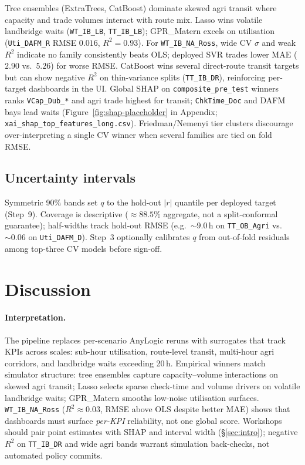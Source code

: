\documentclass[10pt,twocolumn]{article}
\begin{document}
Tree ensembles (ExtraTrees, CatBoost) dominate skewed agri transit where capacity and trade volumes interact with route mix.
Lasso wins volatile landbridge waits (\texttt{WT\_IB\_LB}, \texttt{TT\_IB\_LB}); GPR\_Matern excels on utilisation (\texttt{Uti\_DAFM\_R} RMSE $0.016$, $R^2{=}0.93$).
For \texttt{WT\_IB\_NA\_Ross}, wide CV $\sigma$ and weak $R^2$ indicate no family consistently beats OLS; deployed SVR trades lower MAE ($2.90$ vs.\ $5.26$) for worse RMSE.
CatBoost wins several direct-route transit targets but can show negative $R^2$ on thin-variance splits (\texttt{TT\_IB\_DR}), reinforcing per-target dashboards in the UI.
Global SHAP on \texttt{composite\_pre\_test} winners ranks \texttt{VCap\_Dub\_*} and agri trade highest for transit; \texttt{ChkTime\_Doc} and DAFM bays lead waits (Figure~\ref{fig:shap-placeholder} in Appendix; \texttt{xai\_shap\_top\_features\_long.csv}).
Friedman/Nemenyi tier clusters discourage over-interpreting a single CV winner when several families are tied on fold RMSE.

\subsection{Uncertainty intervals}
\label{sec:results-intervals}

Symmetric 90\% bands set $q$ to the hold-out $|r|$ quantile per deployed target (Step~9).
Coverage is descriptive (${\approx}88.5\%$ aggregate, not a split-conformal guarantee); half-widths track hold-out RMSE (e.g.\ ${\sim}9.0$\,h on \texttt{TT\_OB\_Agri} vs.\ ${\sim}0.06$ on \texttt{Uti\_DAFM\_D}).
Step~3 optionally calibrates $q$ from out-of-fold residuals among top-three CV models before sign-off.

\section{Discussion}
\label{sec:discussion}

\paragraph{Interpretation.}
The pipeline replaces per-scenario AnyLogic reruns with surrogates that track KPIs across scales: sub-hour utilisation, route-level transit, multi-hour agri corridors, and landbridge waits exceeding 20\,h.
Empirical winners match simulator structure: tree ensembles capture capacity--volume interactions on skewed agri transit; Lasso selects sparse check-time and volume drivers on volatile landbridge waits; GPR\_Matern smooths low-noise utilisation surfaces.
\texttt{WT\_IB\_NA\_Ross} ($R^2{\approx}0.03$, RMSE above OLS despite better MAE) shows that dashboards must surface \emph{per-KPI} reliability, not one global score.
Workshops should pair point estimates with SHAP and interval width (\S\ref{sec:intro}); negative $R^2$ on \texttt{TT\_IB\_DR} and wide agri bands warrant simulation back-checks, not automated policy commits.
\end{document}
